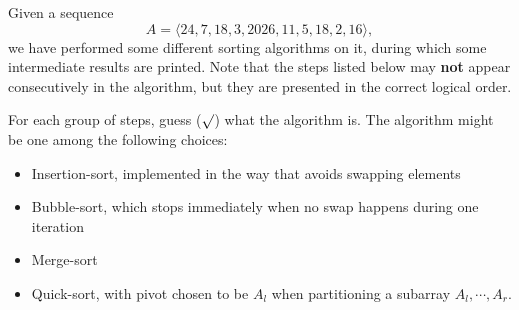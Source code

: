 
Given a sequence
\[
A=\langle 24,7,18,3,2026,11,5,18,2,16\rangle,
\]
we have performed some different sorting algorithms on it, during which some
intermediate results are printed. Note that the steps listed below may
\textbf{not} appear consecutively in the algorithm, but they are presented
in the correct logical order.

For each group of steps, guess (\(\surd\)) what the algorithm is. The algorithm
might be one among the following choices:
\begin{itemize}
  \item Insertion-sort, implemented in the way that avoids swapping elements
  \item Bubble-sort, which stops immediately when no swap happens during one iteration
  \item Merge-sort
  \item Quick-sort, with pivot chosen to be \(A_l\) when partitioning a subarray
  \(A_l,\cdots,A_r\).
\end{itemize}



